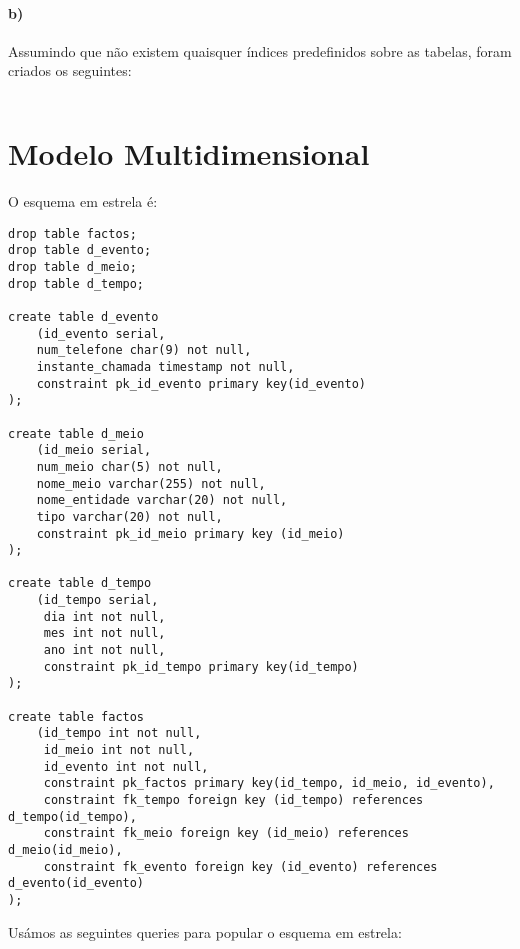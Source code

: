 \documentclass[10pt,a4paper]{article}
\begin{document}
\paragraph{b)}
Assumindo que não existem quaisquer índices predefinidos sobre as tabelas, foram criados os seguintes:

\begin{verbatim}
\end{verbatim}

\section{Modelo Multidimensional}
O esquema em estrela é:
\begin{verbatim}
drop table factos;
drop table d_evento;
drop table d_meio;
drop table d_tempo;

create table d_evento
    (id_evento serial,
    num_telefone char(9) not null,
    instante_chamada timestamp not null,
    constraint pk_id_evento primary key(id_evento)
);

create table d_meio
    (id_meio serial,
    num_meio char(5) not null,
    nome_meio varchar(255) not null,
    nome_entidade varchar(20) not null,
    tipo varchar(20) not null,
    constraint pk_id_meio primary key (id_meio)
);

create table d_tempo
    (id_tempo serial,
     dia int not null,
     mes int not null,
     ano int not null,
     constraint pk_id_tempo primary key(id_tempo)
);

create table factos
    (id_tempo int not null,
     id_meio int not null,
     id_evento int not null,
     constraint pk_factos primary key(id_tempo, id_meio, id_evento),
     constraint fk_tempo foreign key (id_tempo) references d_tempo(id_tempo),
     constraint fk_meio foreign key (id_meio) references d_meio(id_meio),
     constraint fk_evento foreign key (id_evento) references d_evento(id_evento)
);
\end{verbatim}

Usámos as seguintes queries para popular o esquema em estrela:
\end{document}
